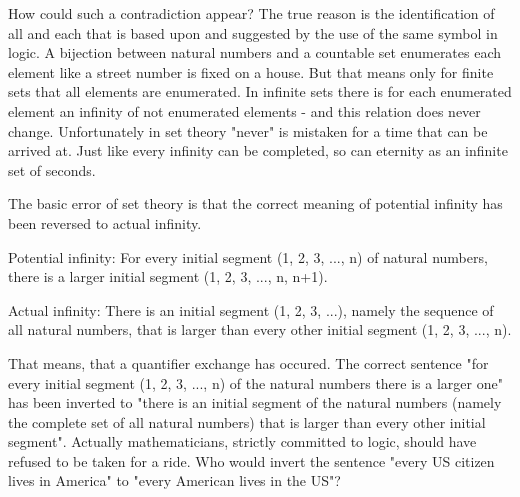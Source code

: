 \documentclass[12pt]{article}
\begin{document}
How could such a contradiction appear? The true reason is the identification of all and each that is based upon and suggested by the use of the same symbol in logic. A bijection between natural numbers and a countable set enumerates each element like a street number is fixed on a house. But that means only for finite sets that all elements are enumerated. In infinite sets there is for each enumerated element an infinity of not enumerated elements - and this relation does never change. Unfortunately in set theory "never" is mistaken for a time that can be arrived at. Just like every infinity can be completed, so can eternity as an infinite set of seconds.


The basic error of set theory is that the correct meaning of potential infinity has been reversed to actual infinity.

Potential infinity: For every initial segment (1, 2, 3, ..., n) of natural numbers, there is a larger initial segment (1, 2, 3, ..., n, n+1).

Actual infinity: There is an initial segment (1, 2, 3, ...), namely the sequence of all natural numbers, that is larger than every other initial segment (1, 2, 3, ..., n).

That means, that a quantifier exchange has occured. The correct sentence "for every initial segment (1, 2, 3, ..., n) of the natural numbers there is a larger one" has been inverted to "there is an initial segment of the natural numbers (namely the complete set of all natural numbers) that is larger than every other initial segment". Actually mathematicians, strictly committed to logic, should have refused to be taken for a ride. Who would invert the sentence "every US citizen lives in America" to "every American lives in the US"? 
\end{document}
